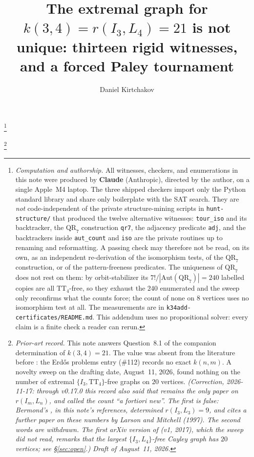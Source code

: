 \documentclass[11pt]{amsart}
\newcommand{\TT}[1]{\mathrm{TT}_{#1}}
\newcommand{\QR}{\mathrm{QR}_7}
\newcommand{\Aut}{\mathrm{Aut}}
\theoremstyle{plain}
\theoremstyle{definition}
\theoremstyle{remark}
\begin{document}
\title[The $k(3,4)=21$ extremal graph is not unique]{The extremal graph
for $k(3,4)=r(I_3,L_4)=21$ is not unique: thirteen rigid witnesses, and a
forced Paley tournament}

\author{Daniel Kirtchakov}
\address{Independent researcher (\texttt{05oz}); no institutional
affiliation. ORCID:
\href{https://orcid.org/0009-0009-5213-4098}{0009-0009-5213-4098}.}

\thanks{\emph{Computation and authorship.} All witnesses, checkers, and
enumerations in this note were produced by \textbf{Claude} (Anthropic),
directed by the author, on a single Apple~M4 laptop. The three shipped
checkers import only the Python standard library and share only
boilerplate with the SAT search. They are \emph{not} code-independent of
the private structure-mining scripts in \texttt{hunt-structure/} that
produced the twelve alternative witnesses: \texttt{tour\_iso} and its
backtracker, the $\QR$ construction \texttt{qr7}, the adjacency predicate
\texttt{adj}, and the backtrackers inside \texttt{aut\_count} and
\texttt{iso} are the private routines up to renaming and reformatting. A
passing check may therefore not be read, on its own, as an independent
re-derivation of the isomorphism tests, of the $\QR$ construction, or of
the pattern-freeness predicates. The uniqueness of $\QR$ does not rest on
them: by orbit-stabilizer its $7!/|\Aut(\QR)|=240$ labelled copies are all
$\TT{4}$-free, so they exhaust the $240$ enumerated and the sweep only
reconfirms what the counts force; the count of none on $8$ vertices uses
no isomorphism test at all. The measurements are in
\texttt{k34add-certificates/README.md}. This addendum uses no
propositional solver: every claim is a finite check a reader can rerun.}

\thanks{\emph{Prior-art record.} This note answers Question~8.1 of the
companion determination \cite{PartG} of $k(3,4)=21$. The value was
absent from the literature before \cite{PartG}: the Erd\H{o}s problems
entry \cite{Blo} (\#112) records no exact $k(n,m)$. A novelty sweep on the
drafting date, August~11, 2026, found nothing on the number of extremal
$\{I_3,\TT{4}\}$-free graphs on $20$ vertices. \emph{(Correction,
2026-11-17: through v0.17.0 this record also said that \cite{IRW21}
remains the only paper on $r(I_m,L_n)$, and called the count ``a fortiori
new''. The first is false: Bermond's \cite{Ber74}, in this note's
references, determined $r(I_3,L_3)=9$, and \cite{IRW21} cites a further
paper on these numbers by Larson and Mitchell (1997). The second words are
withdrawn. The first arXiv version of \cite{IRW21} (v1, 2017), which the
sweep did not read, remarks that the largest $\{I_3,L_4\}$-free Cayley
graph has $20$ vertices; see \S\ref{sec:open}.)}
\emph{Draft of August~11, 2026.}}
\end{document}
